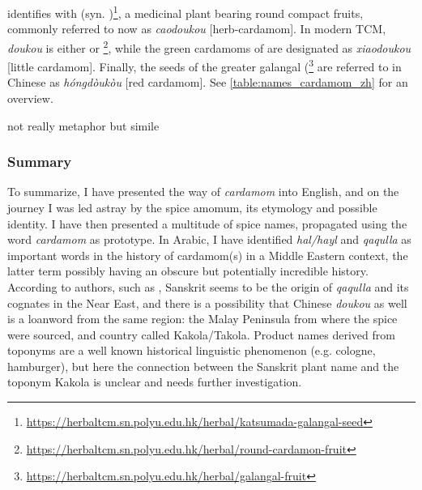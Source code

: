 

\textcite[729]{zhang_dictionary_2015} identifies  with  (syn. )\footnote{\url{https://herbaltcm.sn.polyu.edu.hk/herbal/katsumada-galangal-seed}}, a medicinal plant bearing round compact fruits, commonly referred to now as  \textit{caodoukou} [herb-cardamom]. In modern \gls{TCM}, \textit{doukou} is either  or \footnote{\url{https://herbaltcm.sn.polyu.edu.hk/herbal/round-cardamon-fruit}}, while the green cardamoms of  are designated as  \textit{xiaodoukou} [little cardamom]. Finally, the seeds of the greater galangal (\footnote{\url{https://herbaltcm.sn.polyu.edu.hk/herbal/galangal-fruit}} are referred to in Chinese as 	\textit{hóngdòukòu} [red cardamom]. See \cref{table:names_cardamom_zh} for an overview.







not really metaphor but simile

\subsubsection{Summary}

To summarize, I have presented the way of \textit{cardamom} into English, and on the journey I was led astray by the spice amomum, its etymology and possible identity. I have then presented a multitude of spice names, propagated using the word \textit{cardamom} as prototype. In Arabic, I have identified \textit{hal/hayl} and \textit{qaqulla} as important words in the history of cardamom(s) in a Middle Eastern context, the latter term possibly having an obscure but potentially incredible history. According to authors, such as \textcite{donkin_between_2003}, Sanskrit seems to be the origin of \textit{qaqulla} and its cognates in the Near East, and there is a possibility that Chinese \textit{doukou} as well is a loanword from the same region: the Malay Peninsula from where the spice were sourced, and country called Kakola/Takola. Product names derived from toponyms are a well known historical linguistic phenomenon (e.g. cologne, hamburger), but here the connection between the Sanskrit plant name and the toponym Kakola is unclear and needs further investigation.

